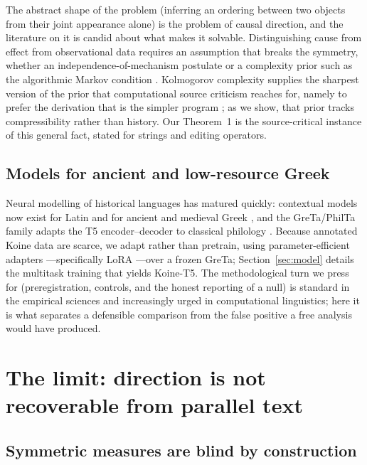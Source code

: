 \documentclass[11pt,letterpaper]{article}
\begin{document}
The abstract shape of the problem (inferring an ordering between two objects from their joint appearance alone) is the problem of causal direction, and the literature on it is candid about what makes it solvable. Distinguishing cause from effect from observational data requires an assumption that breaks the symmetry, whether an independence-of-mechanism postulate or a complexity prior such as the algorithmic Markov condition \citep{janzing2010,peters2017,mooij2016}. Kolmogorov complexity supplies the sharpest version of the prior that computational source criticism reaches for, namely to prefer the derivation that is the simpler program \citep{li2008}; as we show, that prior tracks compressibility rather than history. Our Theorem~1 is the source-critical instance of this general fact, stated for strings and editing operators.

\subsection{Models for ancient and low-resource Greek}

Neural modelling of historical languages has matured quickly: contextual models now exist for Latin \citep{bamman2020} and for ancient and medieval Greek \citep{singh2021}, and the GreTa/PhilTa family adapts the T5 encoder--decoder to classical philology \citep{riemenschneider2023,raffel2020}. Because annotated Koine data are scarce, we adapt rather than pretrain, using parameter-efficient adapters \citep{houlsby2019}---specifically LoRA \citep{hu2021lora}---over a frozen GreTa; Section~\ref{sec:model} details the multitask training that yields Koine-T5. The methodological turn we press for (preregistration, controls, and the honest reporting of a null) is standard in the empirical sciences and increasingly urged in computational linguistics; here it is what separates a defensible comparison from the false positive a free analysis would have produced.

\section{The limit: direction is not recoverable from parallel text}
\label{sec:limit}

\subsection{Symmetric measures are blind by construction}
\end{document}
